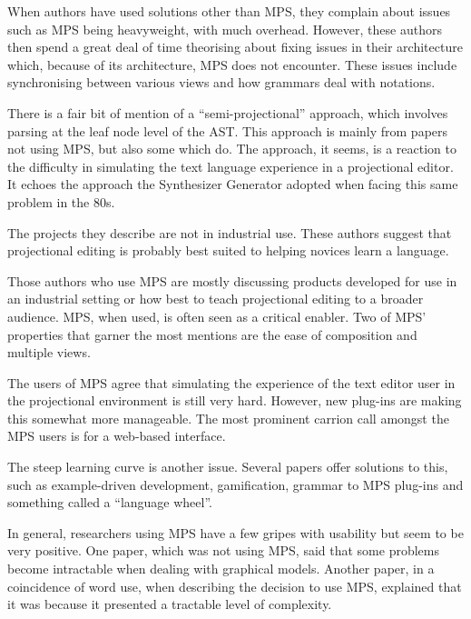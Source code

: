 When authors have used solutions other than MPS, they complain about issues such as MPS being heavyweight, with much overhead.
However, these authors then spend a great deal of time theorising about fixing issues in their architecture which, because of its architecture, MPS does not encounter.
These issues include synchronising between various views and how grammars deal with notations.

There is a fair bit of mention of a ``semi-projectional'' approach, which involves parsing at the leaf node level of the AST.
This approach is mainly from papers not using MPS, but also some which do.
The approach, it seems, is a reaction to the difficulty in simulating the text language experience in a projectional editor. 
It echoes the approach the Synthesizer Generator adopted when facing this same problem in the 80s.

The projects they describe are not in industrial use.
These authors suggest that projectional editing is probably best suited to helping novices learn a language. 

Those authors who use MPS are mostly discussing products developed for use in an industrial setting or how best to teach projectional editing to a broader audience.
MPS, when used, is often seen as a critical enabler.
Two of MPS' properties that garner the most mentions are the ease of composition and multiple views.

The users of MPS agree that simulating the experience of the text editor user in the projectional environment is still very hard.
However, new plug-ins are making this somewhat more manageable.
The most prominent carrion call amongst the MPS users is for a web-based interface.

The steep learning curve is another issue.
Several papers offer solutions to this, such as example-driven development, gamification, grammar to MPS plug-ins and something called a ``language wheel''.

In general, researchers using MPS have a few gripes with usability but seem to be very positive.
One paper, which was not using MPS, said that some problems become intractable when dealing with graphical models.
Another paper, in a coincidence of word use, when describing the decision to use MPS, explained that it was because it presented a tractable level of complexity. 
